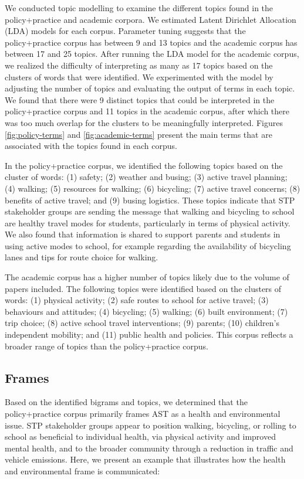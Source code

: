 \documentclass[preprint, 3p,
authoryear]{elsarticle} %
\begin{document}
We conducted topic modelling to examine the different topics found in
the policy+practice and academic corpora. We estimated Latent Dirichlet
Allocation (LDA) models for each corpus. Parameter tuning suggests that
the policy+practice corpus has between 9 and 13 topics and the academic
corpus has between 17 and 25 topics. After running the LDA model for the
academic corpus, we realized the difficulty of interpreting as many as
17 topics based on the clusters of words that were identified. We
experimented with the model by adjusting the number of topics and
evaluating the output of terms in each topic. We found that there were 9
distinct topics that could be interpreted in the policy+practice corpus
and 11 topics in the academic corpus, after which there was too much
overlap for the clusters to be meaningfully interpreted. Figures
\ref{fig:policy-terms} and \ref{fig:academic-terms} present the main
terms that are associated with the topics found in each corpus.

In the policy+practice corpus, we identified the following topics based
on the cluster of words: (1) safety; (2) weather and busing; (3) active
travel planning; (4) walking; (5) resources for walking; (6) bicycling;
(7) active travel concerns; (8) benefits of active travel; and (9)
busing logistics. These topics indicate that STP stakeholder groups are
sending the message that walking and bicycling to school are healthy
travel modes for students, particularly in terms of physical activity.
We also found that information is shared to support parents and students
in using active modes to school, for example regarding the availability
of bicycling lanes and tips for route choice for walking.

The academic corpus has a higher number of topics likely due to the
volume of papers included. The following topics were identified based on
the clusters of words: (1) physical activity; (2) safe routes to school
for active travel; (3) behaviours and attitudes; (4) bicycling; (5)
walking; (6) built environment; (7) trip choice; (8) active school
travel interventions; (9) parents; (10) children's independent mobility;
and (11) public health and policies. This corpus reflects a broader
range of topics than the policy+practice corpus.

\hypertarget{frames}{%
\subsection{Frames}\label{frames}}

Based on the identified bigrams and topics, we determined that the
policy+practice corpus primarily frames AST as a health and
environmental issue. STP stakeholder groups appear to position walking,
bicycling, or rolling to school as beneficial to individual health, via
physical activity and improved mental health, and to the broader
community through a reduction in traffic and vehicle emissions. Here, we
present an example that illustrates how the health and environmental
frame is communicated:
\end{document}
